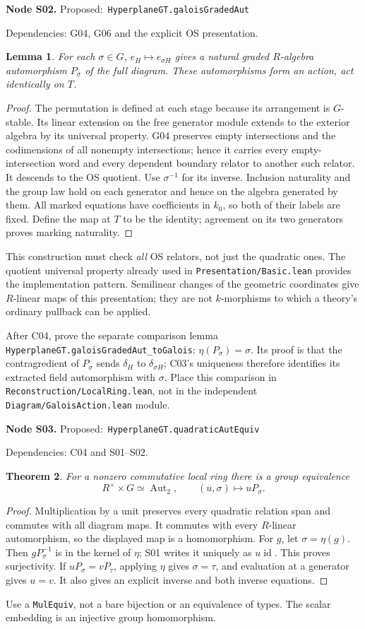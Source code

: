 \documentclass[11pt]{article}
\newtheorem{theorem}{Theorem}[section]
\newtheorem{lemma}[theorem]{Lemma}
\theoremstyle{remark}\newtheorem{remark}[theorem]{Remark}
\newcommand{\Aut}{\operatorname{Aut}}
\newcommand{\id}{\operatorname{id}}
\newcommand{\code}[1]{\nolinkurl{#1}}
\newcommand{\node}[3]{\par\Needspace{8\baselineskip}\smallskip\noindent\textbf{Node #1.}\quad
 \textsf{Proposed:}\ \code{#2}\par\noindent
 \textsf{Dependencies:} #3.\par\smallskip}
\begin{document}
\node{S02}{HyperplaneGT.galoisGradedAut}{G04, G06 and the explicit OS presentation}
\begin{lemma}\label{lem:s02}
For each $\sigma\in G$, $e_H\mapsto e_{\sigma H}$ gives a
natural graded $R$-algebra automorphism $P_\sigma$ of the full
diagram. These automorphisms form an action, act identically
on $T$.
\end{lemma}
\begin{proof}
The permutation is defined at each stage because its arrangement
is $G$-stable. Its linear extension on the free generator module
extends to the exterior algebra by its universal property.
G04 preserves empty intersections and the codimensions of all
nonempty intersections; hence it carries every empty-intersection
word and every dependent boundary relator to another such
relator. It descends to the OS quotient. Use $\sigma^{-1}$ for
its inverse. Inclusion naturality and the group law hold on
each generator and hence on the algebra generated by them.
All marked equations have coefficients in $k_0$, so both of
their labels are fixed. Define the map at $T$ to be the identity;
agreement on its two generators proves marking naturality.
\end{proof}
This construction must check \emph{all} OS relators, not just the
quadratic ones. The quotient universal property already used in
\code{Presentation/Basic.lean} provides the implementation pattern.
Semilinear changes of the geometric coordinates give $R$-linear
maps of this presentation; they are not $k$-morphisms to which a
theory's ordinary pullback can be applied.

After C04, prove the separate comparison lemma
\code{HyperplaneGT.galoisGradedAut_toGalois}:
$\eta(P_\sigma)=\sigma$. Its proof is that the contragredient
of $P_\sigma$ sends $\delta_H$ to $\delta_{\sigma H}$;
C03's uniqueness therefore identifies its extracted field
automorphism with $\sigma$. Place this comparison in
\code{Reconstruction/LocalRing.lean}, not in the independent
\code{Diagram/GaloisAction.lean} module.

\node{S03}{HyperplaneGT.quadraticAutEquiv}{C04 and S01--S02}
\begin{theorem}\label{thm:s03}
For a nonzero commutative local ring there is a group equivalence
\[
 R^\times\times G\simeq\Aut_2,\qquad
 (u,\sigma)\longmapsto uP_\sigma.
\]
\end{theorem}
\begin{proof}
Multiplication by a unit preserves every quadratic relation span
and commutes with all diagram maps. It commutes with every
$R$-linear automorphism, so the displayed map is a homomorphism.
For $g$, let $\sigma=\eta(g)$. Then $gP_\sigma^{-1}$ is in the
kernel of $\eta$; S01 writes it uniquely as $u\id$. This proves
surjectivity. If $uP_\sigma=vP_\tau$, applying $\eta$ gives
$\sigma=\tau$, and evaluation at a generator gives $u=v$.
It also gives an explicit inverse and both inverse equations.
\end{proof}
Use a \code{MulEquiv}, not a bare bijection or an equivalence
of types. The scalar embedding is an injective group homomorphism.
\end{document}
